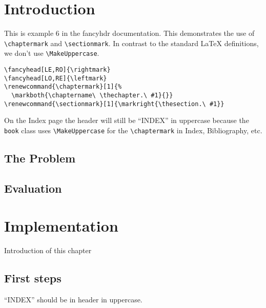 \documentclass{book}
\renewcommand{\chaptermark}[1]{%
  \markboth{\chaptername\ \thechapter.\ #1}{}}
\renewcommand{\sectionmark}[1]{\markright{\thesection.\ #1}}
\begin{document}
\chapter{Introduction}

\begin{boxedminipage}{\textwidth}
This is example 6 in the fancyhdr documentation. 
This demonstrates the use of \verb|\chaptermark| and \verb|\sectionmark|. In contrast to the standard \LaTeX{} definitions, we don't use \verb|\MakeUppercase|.
\begin{verbatim}
\fancyhead[LE,RO]{\rightmark}
\fancyhead[LO,RE]{\leftmark}
\renewcommand{\chaptermark}[1]{%
  \markboth{\chaptername\ \thechapter.\ #1}{}}
\renewcommand{\sectionmark}[1]{\markright{\thesection.\ #1}}
\end{verbatim}
On the Index page the header will still be ``INDEX'' in uppercase because the \texttt{book} class uses \verb|\MakeUppercase| for the  \verb|\chaptermark| in Index, Bibliography, etc.
\end{boxedminipage}

\section{The Problem}
\label{sec:problem}

\lipsum[1]

\section{Evaluation}

\lipsum[2]

\chapter{Implementation}

Introduction of this chapter

\lipsum[3]

\section{First steps}
\label{sec:first-steps}

\lipsum
\printindex
\newpage
``INDEX'' should be in header in uppercase.
\end{document}
